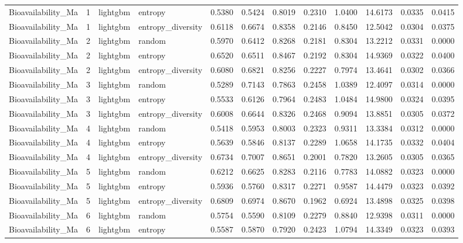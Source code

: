 \begin{tabular}{lrllrrrrrrrr}
Bioavailability_Ma & 1 & lightgbm & entropy & 0.5380 & 0.5424 & 0.8019 & 0.2310 & 1.0400 & 14.6173 & 0.0335 & 0.0415 \\
Bioavailability_Ma & 1 & lightgbm & entropy_diversity & 0.6118 & 0.6674 & 0.8358 & 0.2146 & 0.8450 & 12.5042 & 0.0304 & 0.0375 \\
Bioavailability_Ma & 2 & lightgbm & random & 0.5970 & 0.6412 & 0.8268 & 0.2181 & 0.8304 & 13.2212 & 0.0331 & 0.0000 \\
Bioavailability_Ma & 2 & lightgbm & entropy & 0.6520 & 0.6511 & 0.8467 & 0.2192 & 0.8304 & 14.9369 & 0.0322 & 0.0400 \\
Bioavailability_Ma & 2 & lightgbm & entropy_diversity & 0.6080 & 0.6821 & 0.8256 & 0.2227 & 0.7974 & 13.4641 & 0.0302 & 0.0366 \\
Bioavailability_Ma & 3 & lightgbm & random & 0.5289 & 0.7143 & 0.7863 & 0.2458 & 1.0389 & 12.4097 & 0.0314 & 0.0000 \\
Bioavailability_Ma & 3 & lightgbm & entropy & 0.5533 & 0.6126 & 0.7964 & 0.2483 & 1.0484 & 14.9800 & 0.0324 & 0.0395 \\
Bioavailability_Ma & 3 & lightgbm & entropy_diversity & 0.6008 & 0.6644 & 0.8326 & 0.2468 & 0.9094 & 13.8851 & 0.0305 & 0.0372 \\
Bioavailability_Ma & 4 & lightgbm & random & 0.5418 & 0.5953 & 0.8003 & 0.2323 & 0.9311 & 13.3384 & 0.0312 & 0.0000 \\
Bioavailability_Ma & 4 & lightgbm & entropy & 0.5639 & 0.5846 & 0.8137 & 0.2289 & 1.0658 & 14.1735 & 0.0332 & 0.0404 \\
Bioavailability_Ma & 4 & lightgbm & entropy_diversity & 0.6734 & 0.7007 & 0.8651 & 0.2001 & 0.7820 & 13.2605 & 0.0305 & 0.0365 \\
Bioavailability_Ma & 5 & lightgbm & random & 0.6212 & 0.6625 & 0.8283 & 0.2116 & 0.7783 & 14.0882 & 0.0323 & 0.0000 \\
Bioavailability_Ma & 5 & lightgbm & entropy & 0.5936 & 0.5760 & 0.8317 & 0.2271 & 0.9587 & 14.4479 & 0.0323 & 0.0392 \\
Bioavailability_Ma & 5 & lightgbm & entropy_diversity & 0.6809 & 0.6974 & 0.8670 & 0.1962 & 0.6924 & 13.4898 & 0.0325 & 0.0398 \\
Bioavailability_Ma & 6 & lightgbm & random & 0.5754 & 0.5590 & 0.8109 & 0.2279 & 0.8840 & 12.9398 & 0.0311 & 0.0000 \\
Bioavailability_Ma & 6 & lightgbm & entropy & 0.5587 & 0.5870 & 0.7920 & 0.2423 & 1.0794 & 14.3349 & 0.0323 & 0.0393 \\

\end{tabular}
